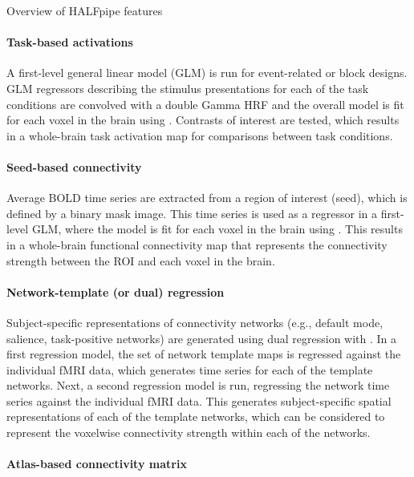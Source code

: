 \begin{featurebox}[label={box:features}]{Overview of HALFpipe features}

\paragraph{Task-based activations}

A first-level general linear model (GLM) is run for event-related or block
designs. GLM regressors describing the stimulus presentations for each of
the task conditions are convolved with a double Gamma HRF and the overall
model is fit for each voxel in the brain using 
\parencite{woolrich_temporal_2001}. Contrasts of interest are tested, which
results in a whole-brain task activation map for comparisons between task
conditions.

\paragraph{Seed-based connectivity}

Average BOLD time series are extracted from a region of interest (seed),
which is defined by a binary mask image. This time series is used as a
regressor in a first-level GLM, where the model is fit for each voxel in
the brain using . This results in a whole-brain functional
connectivity map that represents the connectivity strength between the ROI
and each voxel in the brain.

\paragraph{Network-template (or dual) regression}

Subject-specific representations of connectivity networks (e.g., default
mode, salience, task-positive networks) are generated using dual regression
\parencite{beckmann_dual_reg_2009} with . In a first
regression model, the set of network template maps is regressed against the
individual fMRI data, which generates time series for each of the template
networks. Next, a second regression model is run, regressing the network
time series against the individual fMRI data. This generates
subject-specific spatial representations of each of the template networks,
which can be considered to represent the voxelwise connectivity strength
within each of the networks.

\paragraph{Atlas-based connectivity matrix}


\end{featurebox}

